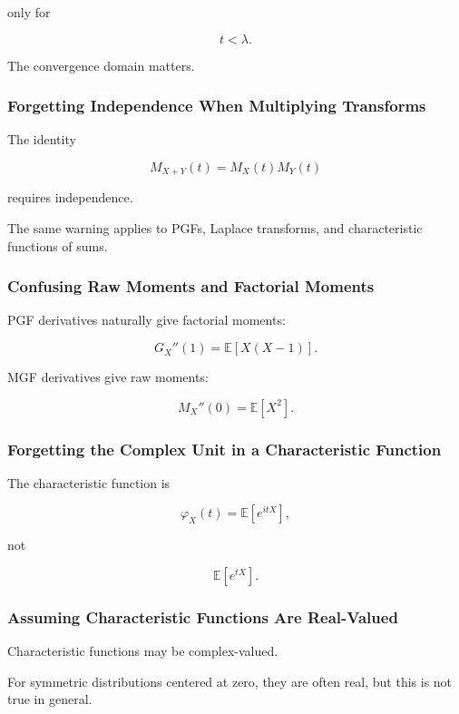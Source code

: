 only for

\[
t<\lambda.
\]

The convergence domain matters.

\subsubsection{Forgetting Independence When Multiplying Transforms}

The identity

\[
M_{X+Y}(t)
=
M_X(t)M_Y(t)
\]

requires independence.

The same warning applies to PGFs, Laplace transforms, and characteristic
functions of sums.

\subsubsection{Confusing Raw Moments and Factorial Moments}

PGF derivatives naturally give factorial moments:

\[
G_X''(1)
=
\mathbb{E}[X(X-1)].
\]

MGF derivatives give raw moments:

\[
M_X''(0)
=
\mathbb{E}[X^2].
\]

\subsubsection{Forgetting the Complex Unit in a Characteristic Function}

The characteristic function is

\[
\boxed{
\varphi_X(t)
=
\mathbb{E}[e^{itX}],
}
\]

not

\[
\mathbb{E}[e^{tX}].
\]

\subsubsection{Assuming Characteristic Functions Are Real-Valued}

Characteristic functions may be complex-valued.

For symmetric distributions centered at zero, they are often real, but
this is not true in general.

